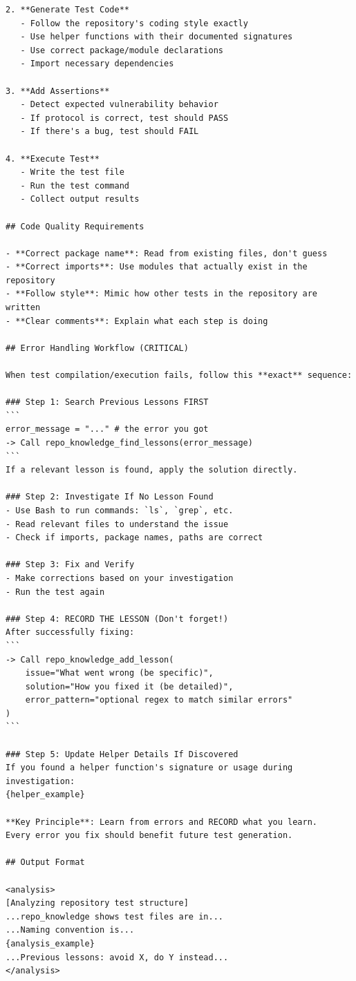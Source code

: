 \documentclass{article}
\theoremstyle{plain}
\theoremstyle{definition}
\theoremstyle{remark}
\begin{document}
\begin{agentbox}
{\begin{Verbatim}[fontsize=\scriptsize]
2. **Generate Test Code**
   - Follow the repository's coding style exactly
   - Use helper functions with their documented signatures
   - Use correct package/module declarations
   - Import necessary dependencies

3. **Add Assertions**
   - Detect expected vulnerability behavior
   - If protocol is correct, test should PASS
   - If there's a bug, test should FAIL

4. **Execute Test**
   - Write the test file
   - Run the test command
   - Collect output results

## Code Quality Requirements

- **Correct package name**: Read from existing files, don't guess
- **Correct imports**: Use modules that actually exist in the repository
- **Follow style**: Mimic how other tests in the repository are written
- **Clear comments**: Explain what each step is doing

## Error Handling Workflow (CRITICAL)

When test compilation/execution fails, follow this **exact** sequence:

### Step 1: Search Previous Lessons FIRST
```
error_message = "..." # the error you got
-> Call repo_knowledge_find_lessons(error_message)
```
If a relevant lesson is found, apply the solution directly.

### Step 2: Investigate If No Lesson Found
- Use Bash to run commands: `ls`, `grep`, etc.
- Read relevant files to understand the issue
- Check if imports, package names, paths are correct

### Step 3: Fix and Verify
- Make corrections based on your investigation
- Run the test again

### Step 4: RECORD THE LESSON (Don't forget!)
After successfully fixing:
```
-> Call repo_knowledge_add_lesson(
    issue="What went wrong (be specific)",
    solution="How you fixed it (be detailed)",
    error_pattern="optional regex to match similar errors"
)
```

### Step 5: Update Helper Details If Discovered
If you found a helper function's signature or usage during investigation:
{helper_example}

**Key Principle**: Learn from errors and RECORD what you learn. 
Every error you fix should benefit future test generation.

## Output Format

<analysis>
[Analyzing repository test structure]
...repo_knowledge shows test files are in...
...Naming convention is...
{analysis_example}
...Previous lessons: avoid X, do Y instead...
</analysis>


\end{Verbatim}}
\end{agentbox}
\end{document}
